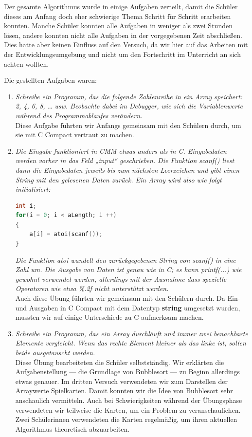 Der gesamte Algorithmus wurde in einige Aufgaben zerteilt, damit die Schüler dieses am Anfang doch eher schwierige Thema Schritt für Schritt erarbeiten konnten. Manche Schüler konnten alle Aufgaben in weniger als zwei Stunden lösen, andere konnten nicht alle Aufgaben in der vorgegebenen Zeit abschließen. Dies hatte aber keinen Einfluss auf den Versuch, da wir hier auf das Arbeiten mit der Entwicklungsumgebung und nicht um den Fortschritt im Unterricht an sich achten wollten.

Die gestellten Aufgaben waren:
\begin{enumerate}
\item \emph{Schreibe ein Programm, das die folgende Zahlenreihe in ein Array speichert: 2, 4, 6, 8, … usw. Beobachte dabei im Debugger, wie sich die Variablenwerte während des Programmablaufes verändern.}\\
Diese Aufgabe führten wir Anfangs gemeinsam mit den Schülern durch, um sie mit C Compact vertraut zu machen.

\item \emph{Die Eingabe funktioniert in CMM etwas anders als in C. Eingabedaten werden vorher in das Feld „input“ geschrieben. Die Funktion scanf() liest dann die Eingabedaten jeweils bis zum nächsten Leerzeichen und gibt einen String mit den gelesenen Daten zurück. Ein Array wird also wie folgt initialisiert:}
\begin{lstlisting}[language=C]
int i;
for(i = 0; i < aLength; i ++)
{
    a[i] = atoi(scanf());
}
\end{lstlisting}
\emph{Die Funktion atoi wandelt den zurückgegebenen String von scanf() in eine Zahl um.
Die Ausgabe von Daten ist genau wie in C; es kann printf(...) wie gewohnt verwendet werden, allerdings mit der Ausnahme dass spezielle Operatoren wie etwa \glqq{}\%.2f\grqq{} nicht unterstützt werden.}\\
Auch diese Übung führten wir gemeinsam mit den Schülern durch. Da Ein- und Ausgaben in C Compact mit dem Datentyp \textbf{string} umgesetzt wurden, mussten wir auf einige Unterschiede zu C aufmerksam machen.

\item \emph{Schreibe ein Programm, das ein Array durchläuft und immer zwei benachbarte Elemente vergleicht. Wenn das rechte Element kleiner als das linke ist, sollen beide ausgetauscht werden.}\\
Diese Übung bearbeiteten die Schüler selbstständig. Wir erklärten die Aufgabenstellung --- die Grundlage von Bubblesort --- zu Beginn allerdings etwas genauer. Im dritten Versuch verwendeten wir zum Darstellen der Arraywerte Spielkarten. Damit konnten wir die Idee von Bubblesort sehr anschaulich vermitteln. Auch bei Schwierigkeiten während der Übungsphase verwendeten wir teilweise die Karten, um ein Problem zu veranschaulichen. Zwei Schülerinnen verwendeten die Karten regelmäßig, um ihren aktuellen Algorithmus theoretisch abzuarbeiten.


\end{enumerate}
